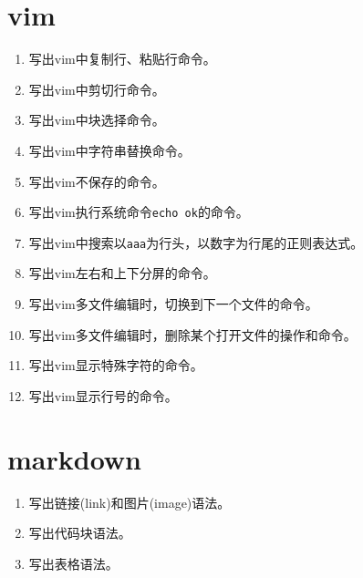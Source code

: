 \documentclass{article}
\newcommand{\answerspace}[1][5]{\vspace{#1\baselineskip}}
\newcommand{\questionitem}[2][5]{\item#2\answerspace[#1]}
\begin{document}
\section{vim}

\begin{enumerate}[leftmargin=*]

  \questionitem[2] 写出vim中复制行、粘贴行命令。
  \questionitem[2] 写出vim中剪切行命令。
  \questionitem[2] 写出vim中块选择命令。
  \questionitem[2] 写出vim中字符串替换命令。
  \questionitem[2] 写出vim不保存的命令。
  \questionitem[2] 写出vim执行系统命令\verb|echo ok|的命令。
  \questionitem[2] 写出vim中搜索以\verb|aaa|为行头，以数字为行尾的正则表达式。
  \questionitem[2] 写出vim左右和上下分屏的命令。
  \questionitem[2] 写出vim多文件编辑时，切换到下一个文件的命令。
  \questionitem[2] 写出vim多文件编辑时，删除某个打开文件的操作和命令。
  \questionitem[2] 写出vim显示特殊字符的命令。
  \questionitem[2] 写出vim显示行号的命令。

\end{enumerate}

\section{markdown}

\begin{enumerate}[leftmargin=*]

  \questionitem[2] 写出链接(link)和图片(image)语法。
  \questionitem[3] 写出代码块语法。
  \questionitem[5] 写出表格语法。

\end{enumerate}
\end{document}
